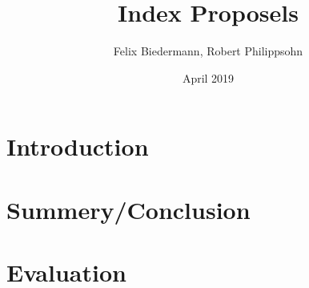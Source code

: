 \documentclass{article}
\title{Index Proposels}
\author{Felix Biedermann, Robert Philippsohn }
\date{April 2019}
\begin{document}
\maketitle

\section{Introduction}
\section{Summery/Conclusion}
\section{Evaluation}
\end{document}

